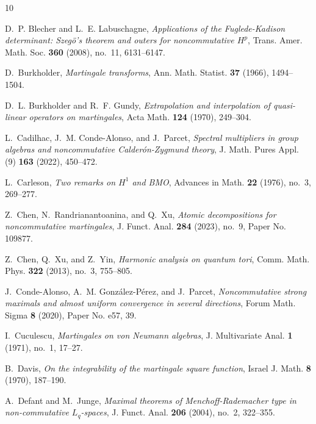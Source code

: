\documentclass[11]{amsart}
\numberwithin{equation}{section}
\begin{document}
\begin{thebibliography}{10}
	
	D.~P. Blecher and L.~E. Labuschagne, \emph{Applications of the
		{F}uglede-{K}adison determinant: {S}zeg\"{o}'s theorem and outers for
		noncommutative {$H^p$}}, Trans. Amer. Math. Soc. \textbf{360} (2008), no.~11,
	6131--6147. 
	
	D.~Burkholder, \emph{Martingale transforms}, Ann. Math. Statist. \textbf{37}
	(1966), 1494--1504. 
	
	D.~L. Burkholder and R.~F. Gundy, \emph{Extrapolation and interpolation of
		quasi-linear operators on martingales}, Acta Math. \textbf{124} (1970),
	249--304. 
	
	L.~Cadilhac, J.~M. Conde-Alonso, and J.~Parcet, \emph{Spectral multipliers in
		group algebras and noncommutative {C}alder\'{o}n-{Z}ygmund theory}, J. Math.
	Pures Appl. (9) \textbf{163} (2022), 450--472. 
	
	L.~Carleson, \emph{Two remarks on {$H^{1}$} and {BMO}}, Advances in Math.
	\textbf{22} (1976), no.~3, 269--277. 
	
	Z.~Chen, N.~Randrianantoanina, and Q.~Xu, \emph{Atomic decompositions for
		noncommutative martingales}, J. Funct. Anal. \textbf{284} (2023), no.~9,
	Paper No. 109877. 
	
	Z.~Chen, Q.~Xu, and Z.~Yin, \emph{Harmonic analysis on quantum tori}, Comm.
	Math. Phys. \textbf{322} (2013), no.~3, 755--805. 
	
	J.~Conde-Alonso, A.~M. Gonz\'{a}lez-P\'{e}rez, and J.~Parcet,
	\emph{Noncommutative strong maximals and almost uniform convergence in
		several directions}, Forum Math. Sigma \textbf{8} (2020), Paper No. e57, 39.
	
	I.~Cuculescu, \emph{Martingales on von {N}eumann algebras}, J. Multivariate
	Anal. \textbf{1} (1971), no.~1, 17--27. 
	
	B.~Davis, \emph{On the integrability of the martingale square function}, Israel
	J. Math. \textbf{8} (1970), 187--190. 
	
	A.~Defant and M.~Junge, \emph{Maximal theorems of {M}enchoff-{R}ademacher type
		in non-commutative {$L_q$}-spaces}, J. Funct. Anal. \textbf{206} (2004),
	no.~2, 322--355. 
	

\end{thebibliography}
\end{document}
